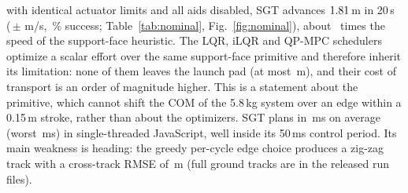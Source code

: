 with identical actuator limits and all aids disabled, SGT advances
$1.81$\,m in 20\,s (\nSgtSpeed\,$\pm$\,\nSgtSpeedStd\,m/s,
\nSgtSuccess\,\% success; Table~\ref{tab:nominal}, Fig.~\ref{fig:nominal}),
about \speedRatio\ times the speed of the support-face heuristic. The
LQR, iLQR and QP-MPC schedulers optimize a scalar effort over the same
support-face primitive and therefore inherit its limitation: none of
them leaves the launch pad (at most \baseBestProgress\,m), and their
cost of transport is an order of magnitude higher. This is a statement
about the primitive, which cannot shift the COM of the 5.8\,kg system
over an edge within a 0.15\,m stroke, rather than about the optimizers.
SGT plans in \nSgtSolveMs\,ms on average (worst \nSgtSolveMax\,ms) in
single-threaded JavaScript, well inside its 50\,ms control period. Its
main weakness is heading: the greedy per-cycle edge choice produces a
zig-zag track with a cross-track RMSE of \nSgtRmse\,m
(full ground tracks are in the released run files).
